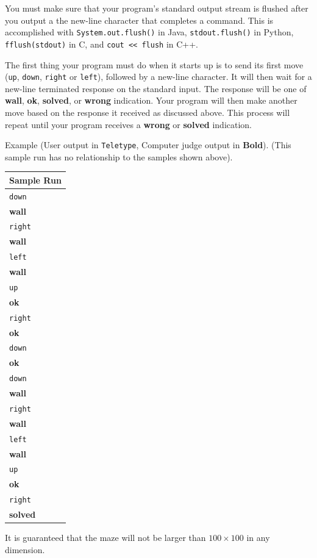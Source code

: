 You must make sure that your program's standard output stream is flushed after you output a the new-line 
character that completes a command.
This is accomplished with \texttt{System.out.flush()} in Java, \texttt{stdout.flush()} in Python,
\texttt{fflush(stdout)} in C, and \texttt{cout << flush} in C++.

The first thing your program must do when it starts up is to send its first move 
(\texttt{up}, \texttt{down}, \texttt{right} or \texttt{left}),
followed by a new-line character. It will then wait for a new-line terminated response on the standard
input. The response will be one of \textbf{wall}, \textbf{ok}, \textbf{solved}, or \textbf{wrong}
indication. Your program will then make another move based on the response it received as discussed above. 
This process will repeat until your program receives a \textbf{wrong} or \textbf{solved} indication.

Example (User output in \texttt{Teletype}, Computer judge output in \textbf{Bold}). 
(This sample run has no relationship to the samples shown above).

\begin{center}
\begin{tabular}{|l|}
\hline
\textbf{Sample Run} \\
\hline
\texttt{down} \\
\textbf{wall} \\
\texttt{right} \\
\textbf{wall} \\
\texttt{left} \\
\textbf{wall} \\
\texttt{up} \\
\textbf{ok} \\
\texttt{right} \\
\textbf{ok} \\
\texttt{down} \\
\textbf{ok} \\
\texttt{down} \\
\textbf{wall} \\
\texttt{right} \\
\textbf{wall} \\
\texttt{left} \\
\textbf{wall} \\
\texttt{up} \\
\textbf{ok} \\
\texttt{right} \\
\textbf{solved} \\
\hline
\end{tabular}
\end{center}

It is guaranteed that the maze will not be larger than $100 \times 100$ in any dimension.
